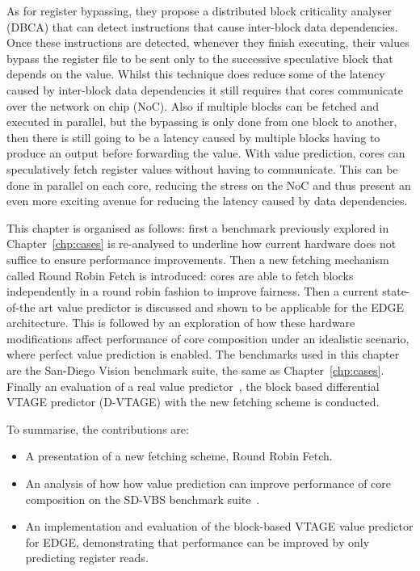 As for register bypassing, they propose a distributed block criticality analyser (DBCA) that can detect instructions that cause inter-block data dependencies.
Once these instructions are detected, whenever they finish executing, their values bypass the register file to be sent only to the successive speculative block that depends on the value.
Whilst this technique does reduce some of the latency caused by inter-block data dependencies it still requires that cores communicate over the network on chip (NoC).
Also if multiple blocks can be fetched and executed in parallel, but the bypassing is only done from one block to another, then there is still going to be a latency caused by multiple blocks having to produce an output before forwarding the value.
With value prediction, cores can speculatively fetch register values without having to communicate.
This can be done in parallel on each core, reducing the stress on the NoC and thus present an even more exciting avenue for reducing the latency caused by data dependencies.

This chapter is organised as follows: first a benchmark previously explored in Chapter~\ref{chp:cases} is re-analysed to underline how current hardware does not suffice to ensure performance improvements.
Then a new fetching mechanism called Round Robin Fetch is introduced: cores are able to fetch blocks independently in a round robin fashion to improve fairness.
Then a current state-of-the art value predictor is discussed and shown to be applicable for the EDGE architecture.
This is followed by an exploration of how these hardware modifications affect performance of core composition under an idealistic scenario, where perfect value prediction is enabled.
The benchmarks used in this chapter are the San-Diego Vision benchmark suite, the same as Chapter~\ref{chp:cases}.
Finally an evaluation of a real value predictor~\cite{peraisBeBop2015}, the block based differential VTAGE predictor (D-VTAGE) with the new fetching scheme is conducted.

To summarise, the contributions are:

\begin{itemize}
\item A presentation of a new fetching scheme, Round Robin Fetch.
\vspace{-1em}
\item An analysis of how how value prediction can improve performance of core composition on the SD-VBS benchmark suite~\cite{sdvbs}.
\vspace{-1em}
\item An implementation and evaluation of the block-based VTAGE value predictor for EDGE, demonstrating that performance can be improved by only predicting register reads.
\end{itemize}